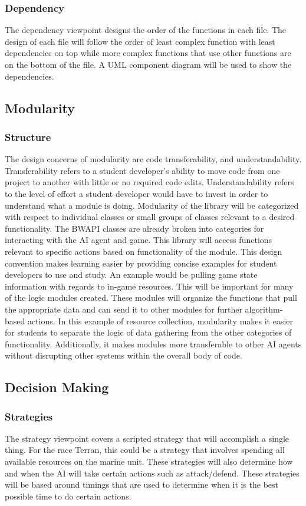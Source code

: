 \documentclass[10pt,letterpaper,onecolumn,draftclsnofoot]{IEEEtran}
\begin{document}
\subsubsection{Dependency}
	The dependency viewpoint designs the order of the functions in each file. The design of each file will follow the order of least complex function with least dependencies on top while more complex functions that use other functions are on the bottom of the file. A UML component diagram will be used to show the dependencies.
\subsection{Modularity}
\subsubsection{Structure}
	The design concerns of modularity are code transferability, and understandability. Transferability refers to a student developer's ability to move code from one project to another with little or no required code edits. Understandability refers to the level of effort a student developer would have to invest in order to understand what a module is doing. Modularity of the library will be categorized with respect to individual classes or small groups of classes relevant to a desired functionality. The BWAPI classes are already broken into categories for interacting with the AI agent and game. This library will access functions relevant to specific actions based on functionality of the module. This design convention makes learning easier by providing concise examples for student developers to use and study.
	An example would be pulling game state information with regards to in-game resources. This will be important for many of the logic modules created. These modules will organize the functions that pull the appropriate data and can send it to other modules for further algorithm-based actions. In this example of resource collection, modularity makes it easier for students to separate the logic of data gathering from the other categories of functionality. Additionally, it makes modules more transferable to other AI agents without disrupting other systems within the overall body of code. 
\subsection{Decision Making}
\subsubsection{Strategies}
	The strategy viewpoint covers a scripted strategy that will accomplish a single thing. For the race Terran, this could be a strategy that involves spending all available resources on the marine unit. These strategies will also determine how and when the AI will take certain actions such as attack/defend. These strategies will be based around timings that are used to determine when it is the best possible time to do certain actions.
\end{document}
